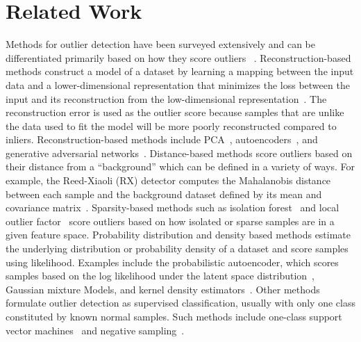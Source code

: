 \documentclass[utf8]{frontiersFPHY} %
\begin{document}
\section{Related Work}

Methods for outlier detection have been 
surveyed extensively and can be differentiated primarily based on how they 
score outliers
~\cite{pimentel2014review,chandola2009anomaly,markou2003novelty,
markou2003novelty2}.
%
Reconstruction-based methods construct a model of a dataset by learning 
a mapping between the input data and a lower-dimensional representation that
minimizes the loss between the input and its reconstruction from the 
low-dimensional representation~\citep{kerner2020comparison}. The 
reconstruction error is used as the outlier score because samples
that are unlike the data used to fit the model will be more poorly 
reconstructed compared to inliers. Reconstruction-based methods
include PCA~\cite{jablonski2015principal}, 
autoencoders~\cite{richter2017safe}, and
generative adversarial networks~\cite{akcay2018ganomaly}.
%
Distance-based methods score outliers based on their distance from a
``background'' which can be defined in a variety of ways. For example,
the Reed-Xiaoli (RX) detector computes the 
Mahalanobis distance between each sample and the background dataset
defined by its mean and covariance matrix~\cite{reed1990adaptive}.
%
Sparsity-based methods such as isolation forest~\cite{liu2008isolation}
and local outlier factor~\cite{breunig2000lof}
score outliers based on how isolated or sparse samples 
are in a given feature space. 
%
Probability distribution and density based methods estimate the underlying 
distribution or probability density of a dataset and score samples using
likelihood. Examples include the probabilistic
autoencoder, which scores samples based on the log likelihood under the 
latent space distribution~\cite{bohm2020probabilistic}, Gaussian mixture 
Models, and kernel density estimators~\cite{chandola2009anomaly}. 
%
Other methods formulate outlier detection as supervised classification, 
usually with only one class constituted by 
known normal samples.
Such methods include one-class support vector 
machines~\cite{scholkopf1999support}
and negative sampling~\cite{sipple:neg-sampling20}.
\end{document}
